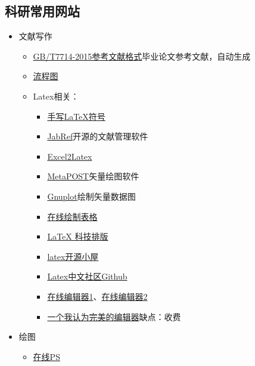 \documentclass[UTF8]{ctexbook}
\begin{document}
\subsection{科研常用网站}
\begin{itemize}
	\item 文献写作
	      \begin{itemize}
		      \item \href{http://www.latexstudio.net/archives/6888.html}{GB/T7714-2015参考文献格式}\quad 毕业论文参考文献，自动生成
		      \item \href{https://www.processon.com/login;jsessionid=022BCDCA031DD3C240BE7FD87D942F03.jvm1?backUrl=/diagraming/5be7a513e4b0d74dc539976e}{流程图}
		      \item Latex相关：
		            \begin{itemize}
			            \item \href{http://detexify.kirelabs.org/classify.html}{手写LaTeX符号}
			            \item \href{http://www.jabref.org}{JabRef}\quad 开源的文献管理软件
			            \item \href{http://www.latexstudio.net/archives/6992.html}{Excel2Latex}
			            \item \href{http://www.ursoswald.ch/metapost/introduction.html}{MetaPOST}\quad 矢量绘图软件
			            \item \href{http://www.gnuplot.info}{Gnuplot}\quad 绘制矢量数据图
			            \item \href{https://www.tablesgenerator.com/#}{在线绘制表格}
			            \item \href{http://math.ecnu.edu.cn/~jypan/Teaching/Latex/}{LaTeX 科技排版}
			            \item \href{http://www.latexstudio.net/}{latex开源小屋}
			            \item \href{https://github.com/latexstudio}{Latex中文社区Github}
			            \item \href{https://www.overleaf.com/login}{在线编辑器1}、\href{http://www.math.org.cn/tex/index.html}{在线编辑器2}
			            \item \href{http://www.bakoma-tex.com}{一个我认为完美的编辑器}\quad 缺点：收费
		            \end{itemize}
	      \end{itemize}
	\item 绘图
	      \begin{itemize}
		      \item \href{https://www.photopea.com}{在线PS}

\end{itemize}
\end{itemize}
\end{document}

